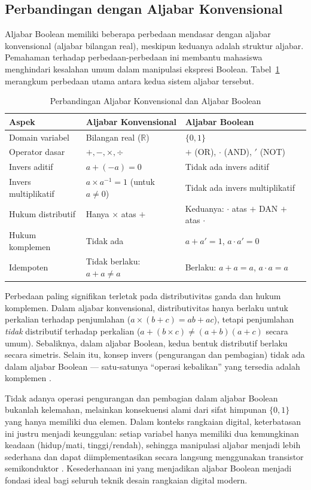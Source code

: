\subsection{Perbandingan dengan Aljabar Konvensional}

Aljabar Boolean memiliki beberapa perbedaan mendasar dengan aljabar konvensional (aljabar bilangan real), meskipun keduanya adalah struktur aljabar. Pemahaman terhadap perbedaan-perbedaan ini membantu mahasiswa menghindari kesalahan umum dalam manipulasi ekspresi Boolean. Tabel~\ref{tab:boolean-vs-konvensional} merangkum perbedaan utama antara kedua sistem aljabar tersebut.

\begin{table}[htbp]
\centering
\renewcommand{\arraystretch}{1.3}
\begin{tabular}{|p{4cm}|p{5cm}|p{5cm}|}
\hline
\textbf{Aspek} & \textbf{Aljabar Konvensional} & \textbf{Aljabar Boolean} \\ \hline
Domain variabel & Bilangan real ($\mathbb{R}$) & $\{0, 1\}$ \\ \hline
Operator dasar & $+, -, \times, \div$ & $+$ (OR), $\cdot$ (AND), $'$ (NOT) \\ \hline
Invers aditif & $a + (-a) = 0$ & Tidak ada invers aditif \\ \hline
Invers multiplikatif & $a \times a^{-1} = 1$ (untuk $a \neq 0$) & Tidak ada invers multiplikatif \\ \hline
Hukum distributif & Hanya $\times$ atas $+$ & Keduanya: $\cdot$ atas $+$ DAN $+$ atas $\cdot$ \\ \hline
Hukum komplemen & Tidak ada & $a + a' = 1$, $a \cdot a' = 0$ \\ \hline
Idempoten & Tidak berlaku: $a + a \neq a$ & Berlaku: $a + a = a$, $a \cdot a = a$ \\ \hline
\end{tabular}
\caption{Perbandingan Aljabar Konvensional dan Aljabar Boolean}
\label{tab:boolean-vs-konvensional}
\end{table}

Perbedaan paling signifikan terletak pada distributivitas ganda dan hukum komplemen. Dalam aljabar konvensional, distributivitas hanya berlaku untuk perkalian terhadap penjumlahan ($a \times (b + c) = ab + ac$), tetapi penjumlahan \emph{tidak} distributif terhadap perkalian ($a + (b \times c) \neq (a+b)(a+c)$ secara umum). Sebaliknya, dalam aljabar Boolean, kedua bentuk distributif berlaku secara simetris. Selain itu, konsep invers (pengurangan dan pembagian) tidak ada dalam aljabar Boolean --- satu-satunya ``operasi kebalikan'' yang tersedia adalah komplemen \cite{rosen2019}.

Tidak adanya operasi pengurangan dan pembagian dalam aljabar Boolean bukanlah kelemahan, melainkan konsekuensi alami dari sifat himpunan $\{0, 1\}$ yang hanya memiliki dua elemen. Dalam konteks rangkaian digital, keterbatasan ini justru menjadi keunggulan: setiap variabel hanya memiliki dua kemungkinan keadaan (hidup/mati, tinggi/rendah), sehingga manipulasi aljabar menjadi lebih sederhana dan dapat diimplementasikan secara langsung menggunakan transistor semikonduktor \cite{allaboutcircuits_boolean}. Kesederhanaan ini yang menjadikan aljabar Boolean menjadi fondasi ideal bagi seluruh teknik desain rangkaian digital modern.

